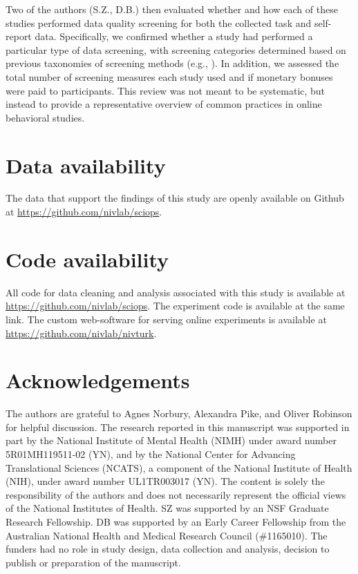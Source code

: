 \documentclass[a4paper,notitlepage,12pt]{article}
\begin{document}
\begin{refsection}[main]
Two of the authors (S.Z., D.B.) then evaluated whether and how each of these studies performed data quality screening for both the collected task and self-report data. Specifically, we confirmed whether a study had performed a particular type of data screening, with screening categories determined based on previous taxonomies of screening methods (e.g., \cite{curran2016methods}). In addition, we assessed the total number of screening measures each study used and if monetary bonuses were paid to participants. This review was not meant to be systematic, but instead to provide a representative overview of common practices in online behavioral studies.

\section*{Data availability}

The data that support the findings of this study are openly available on Github at \url{https://github.com/nivlab/sciops}.

\section*{Code availability}

All code for data cleaning and analysis associated with this study is available at \url{https://github.com/nivlab/sciops}. The experiment code is available at the same link.  The custom web-software for serving online experiments is available at \url{https://github.com/nivlab/nivturk}. 

\section*{Acknowledgements}

The authors are grateful to Agnes Norbury, Alexandra Pike, and Oliver Robinson for helpful discussion. The research reported in this manuscript was supported in part by the National Institute of Mental Health (NIMH) under award number 5R01MH119511-02 (YN), and by the National Center for Advancing Translational Sciences (NCATS), a component of the National Institute of Health (NIH), under award number UL1TR003017 (YN). The content is solely the responsibility of the authors and does not necessarily represent the official views of the National Institutes of Health. SZ was supported by an NSF Graduate Research Fellowship. DB was supported by an Early Career Fellowship from the Australian National Health and Medical Research Council (\#1165010). The funders had no role in study design, data collection and analysis, decision to publish or preparation of the manuscript.


\end{refsection}
\end{document}
